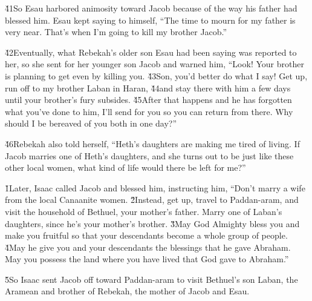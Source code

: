 \v{41}So Esau harbored animosity toward Jacob because of the way his father had blessed him. Esau kept saying to himself, ``The time to mourn for my father is very near. That's when I'm going to kill my brother Jacob.''

\v{42}Eventually, what Rebekah's older son Esau had been saying was reported to her, so she sent for her younger son Jacob and warned him, ``Look! Your brother is planning to get even by killing you. \v{43}Son, you'd better do what I say! Get up, run off to my brother Laban in Haran, \v{44}and stay there with him a few days until your brother's fury subsides. \v{45}After that happens and he has forgotten what you've done to him, I'll send for you so you can return from there. Why should I be bereaved of you both in one day?''

\v{46}Rebekah also told herself, ``Heth's daughters are making me tired of living. If Jacob marries one of Heth's daughters, and she turns out to be just like these other local women, what kind of life would there be left for me?''

\v{1}Later, Isaac called Jacob and blessed him, instructing him, ``Don't marry a wife from the local Canaanite women. \v{2}Instead, get up, travel to Paddan-aram, and visit the household of Bethuel, your mother's father. Marry one of Laban's daughters, since he's your mother's brother. \v{3}May God Almighty bless you and make you fruitful so that your descendants become a whole group of people. \v{4}May he give you and your descendants the blessings that he gave Abraham. May you possess the land where you have lived that God gave to Abraham.''

\v{5}So Isaac sent Jacob off toward Paddan-aram to visit Bethuel's son Laban, the Aramean and brother of Rebekah, the mother of Jacob and Esau.

